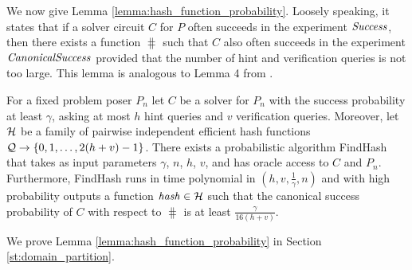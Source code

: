 We now give Lemma \ref{lemma:hash_function_probability}. Loosely speaking, it states that if a solver circuit $C$ for $P$
often succeeds in the experiment $\operatorname{\mathit{Success}}$, then there exists a function $\hash$ such that $C$ also
often succeeds in the experiment $\operatorname{\mathit{CanonicalSuccess}}$ provided that the number of hint and verification queries is not too large.
This lemma is analogous to Lemma 4 from \cite{dodis2009security}.

\begin{lemma}
\label{lemma:hash_function_probability}
For a fixed problem poser $P_n$ let $C$ be a solver for $P_n$ with the success probability at least $\gamma$,
asking at most $h$ hint queries and $v$ verification queries.
Moreover, let $\mathcal{H}$ be a family of pairwise independent efficient hash functions $\mathcal{Q} \rightarrow \{0,1, \dots,2(h+v)-1\}$.
There exists a probabilistic algorithm FindHash that takes as input parameters $\gamma$, $n$, $h$, $v$, and has oracle access to $C$ and $P_n$.
Furthermore, FindHash runs in time polynomial in $(h,v,\frac{1}{\gamma},n)$ and with high probability outputs a function $\operatorname{\mathit{hash}} \in \mathcal{H}$
such that the canonical success probability of $C$ with respect to $\hash$ is at least $\frac{\gamma}{16(h+v)}$.
\end{lemma}
We prove Lemma \ref{lemma:hash_function_probability} in Section \ref{st:domain_partition}.
%
